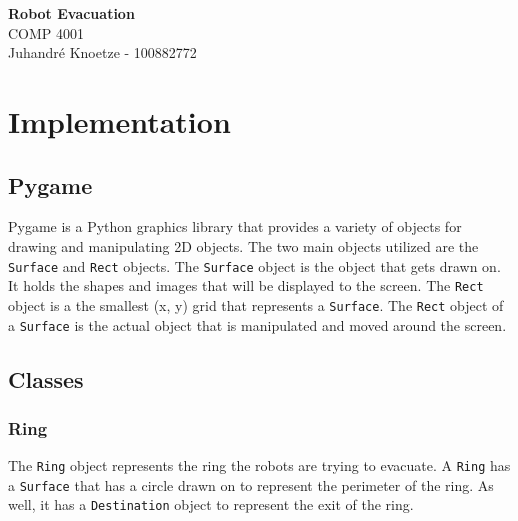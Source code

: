 \documentclass[12pt,letterpaper]{article}
\begin{document}
    \begin{center}
        {\Large\bf Robot Evacuation} \\
        \vspace{0.25em}
        {\large COMP 4001}\\
        \vspace{0.25em}
        Juhandr\'{e} Knoetze - 100882772 \\
    \end{center}

    \section{Implementation}
    \subsection{Pygame}
        Pygame is a Python graphics library that provides a variety of objects for drawing and manipulating 2D objects. The two main objects utilized are the \texttt{Surface} and \texttt{Rect} objects. The \texttt{Surface} object is the object that gets drawn on. It holds the shapes and images that will be displayed to the screen. The \texttt{Rect} object is a the smallest (x, y) grid that represents a \texttt{Surface}. The \texttt{Rect} object of a \texttt{Surface} is the actual object that is manipulated and moved around the screen.
    
    \subsection{Classes}  
    \subsubsection{Ring}
        The \texttt{Ring} object represents the ring the robots are trying to evacuate. A \texttt{Ring} has a \texttt{Surface} that has a circle drawn on to represent the perimeter of the ring. As well, it has a \texttt{Destination} object to represent the exit of the ring. 
        \newline
    
\end{document}
